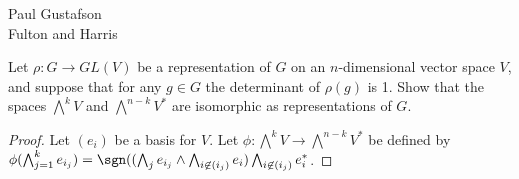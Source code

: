 \documentclass{article}
\begin{document}
\noindent Paul Gustafson\\
\noindent Fulton and Harris

 Let $\rho: G \to GL(V)$ be a representation of $G$ on an $n$-dimensional vector space $V$, and suppose that for any $g \in G$ the determinant of $\rho(g)$ is 1. Show that the spaces $\bigwedge^k V$ and $\bigwedge^{n-k} V^*$ are isomorphic as representations of $G$.
\begin{proof}
Let $(e_i)$ be a basis for $V$. Let $\phi: \bigwedge^k V \to \bigwedge^{n-k} V^*$ be defined by $\phi(\bigwedge_{j=1}^k e_{i_j})  = \sgn((\bigwedge_j e_{i_j} \wedge \bigwedge_{i \not\in (i_j)}  e_i) \bigwedge_{i \not\in (i_j)}  e_i^*$. 
\end{proof}
\end{document}
